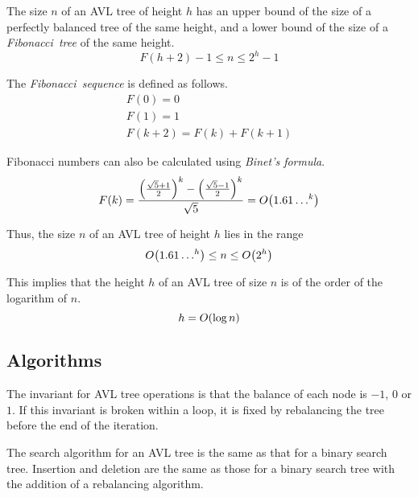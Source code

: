 The size \( n \) of an AVL tree of height \( h \) has an upper bound of the size of a perfectly balanced tree of the same height, and a lower bound of the size of a \emph{Fibonacci~tree} of the same height.
\begin{equation*}
  F\!\left( h + 2 \right) - 1 \leq n \leq 2^{h} - 1
\end{equation*}

The \emph{Fibonacci~sequence} is defined as follows.
\begin{gather*}
  F\!\left( 0 \right) = 0 \\
  F\!\left( 1 \right) = 1 \\
  F\!\left( k + 2 \right) = F\!\left( k \right) + F\!\left( k + 1 \right)
\end{gather*}

Fibonacci numbers can also be calculated using \emph{Binet's formula}.
\begin{equation*}
  F\!\left( k \right) = \frac{\left( \frac{\sqrt{5} + 1}{2} \right)^{k} - \left( \frac{\sqrt{5} - 1}{2} \right)^{k}}{\sqrt{5}} = O\!\left({1.61\ldots}^{k}\right)
\end{equation*}

Thus, the size \( n \) of an AVL tree of height \( h \) lies in the range
\begin{equation*}
  O\!\left({1.61\ldots}^{h}\right) \leq n \leq O\!\left(2^{h}\right)
\end{equation*}

This implies that the height \( h \) of an AVL tree of size \( n \) is of the order of the logarithm of \( n \).
\begin{equation*}
  h = O\!\left(\log n\right)
\end{equation*}

\subsection{Algorithms}

The invariant for AVL tree operations is that the balance of each node is \( -1 \), \( 0 \) or \( 1 \).
If this invariant is broken within a loop, it is fixed by rebalancing the tree before the end of the iteration.

The search algorithm for an AVL tree is the same as that for a binary search tree.
Insertion and deletion are the same as those for a binary search tree with the addition of a rebalancing algorithm.

